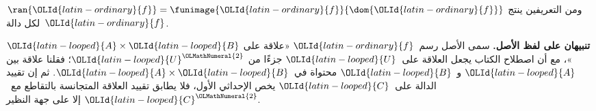 \documentclass[../../../include/open-logic-section]{subfiles}
\begin{document}
\begin{explain}
ومن التعريفين ينتج $\ran{{\OLId{latin-ordinary}{f}}} =
\funimage{{\OLId{latin-ordinary}{f}}}{\dom{{\OLId{latin-ordinary}{f}}}}$ لكل دالة~${\OLId{latin-ordinary}{f}}$.
\end{explain}

\begin{explain}
\textbf{تنبيهان على لفظ الأصل.} سمى الأصل رسم~${\OLId{latin-ordinary}{f}}$ «علاقة على
${\OLId{latin-looped}{A}}\times {\OLId{latin-looped}{B}}$»، مع أن اصطلاح الكتاب يجعل العلاقة على~${\OLId{latin-looped}{U}}$ جزءًا من
${\OLId{latin-looped}{U}}^{\OLMathNumeral{2}}$؛ فقلنا علاقة بين ${\OLId{latin-looped}{A}}$ و~${\OLId{latin-looped}{B}}$ محتواة في~${\OLId{latin-looped}{A}}\times {\OLId{latin-looped}{B}}$. ثم إن
تقييد الدالة على~${\OLId{latin-looped}{C}}$ يخص الإحداثي الأول، فلا يطابق تقييد العلاقة
المتجانسة بالتقاطع مع~${\OLId{latin-looped}{C}}^{\OLMathNumeral{2}}$ إلا على جهة النظير.
\end{explain}
\end{document}
